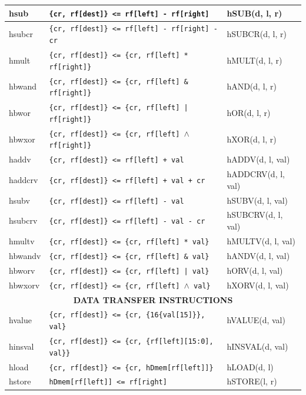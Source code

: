 {{\begin{longtable}{|l|l|l|}
hsub   & \texttt{\{cr, rf[dest]\} <= rf[left] - rf[right]}            & hSUB(d, l, r) \\ \hline
hsubcr & \texttt{\{cr, rf[dest]\} <= rf[left] - rf[right] - cr}       & hSUBCR(d, l, r) \\ \hline
hmult  & \texttt{\{cr, rf[dest]\} <= \{cr, rf[left] * rf[right]\}}    & hMULT(d, l, r) \\ \hline
hbwand & \texttt{\{cr, rf[dest]\} <= \{cr, rf[left] \& rf[right]\}}   & hAND(d, l, r) \\ \hline
hbwor  & \texttt{\{cr, rf[dest]\} <= \{cr, rf[left] | rf[right]\}}    & hOR(d, l, r)  \\ \hline
hbwxor & \texttt{\{cr, rf[dest]\} <= \{cr, rf[left] $\wedge$ rf[right]\}} & hXOR(d, l, r) \\ \hline
haddv  & \texttt{\{cr, rf[dest]\} <= rf[left] + val}                  & hADDV(d, l, val) \\ \hline
haddcrv & \texttt{\{cr, rf[dest]\} <= rf[left] + val + cr}            & hADDCRV(d, l, val) \\ \hline
hsubv  & \texttt{\{cr, rf[dest]\} <= rf[left] - val}                  & hSUBV(d, l, val) \\ \hline
hsubcrv & \texttt{\{cr, rf[dest]\} <= rf[left] - val - cr}            & hSUBCRV(d, l, val) \\ \hline
hmultv & \texttt{\{cr, rf[dest]\} <= \{cr, rf[left] * val\}}          & hMULTV(d, l, val) \\ \hline
hbwandv & \texttt{\{cr, rf[dest]\} <= \{cr, rf[left] \& val\}}        & hANDV(d, l, val) \\ \hline
hbworv & \texttt{\{cr, rf[dest]\} <= \{cr, rf[left] | val\}}          & hORV(d, l, val) \\ \hline
hbwxorv & \texttt{\{cr, rf[dest]\} <= \{cr, rf[left] $\wedge$ val\}}  & hXORV(d, l, val) \\ \hline
\multicolumn{3}{|c|}{\textbf{DATA TRANSFER INSTRUCTIONS}} \\
\hline
hvalue  & \texttt{\{cr, rf[dest]\} <= \{cr, \{16\{val[15]\}\}, val\}} & hVALUE(d, val) \\ \hline
hinsval & \texttt{\{cr, rf[dest]\} <= \{cr, \{rf[left][15:0], val\}\}} & hINSVAL(d, val) \\ \hline
hload   & \texttt{\{cr, rf[dest]\} <= \{cr, hDmem[rf[left]]\}}        & hLOAD(d, l)    \\ \hline
hstore  & \texttt{hDmem[rf[left]] <= rf[right]}                       & hSTORE(l, r)   \\ \hline
\end{longtable}
}
}





